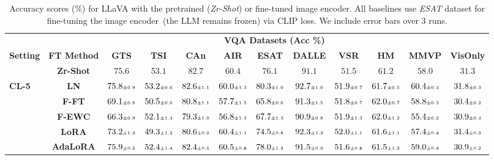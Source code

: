 \begin{table}
\caption{Accuracy scores (\%) for LLaVA with the pretrained (\emph{Zr-Shot}) or fine-tuned image encoder. All baselines use \emph{ESAT} dataset for fine-tuning the image encoder~(the LLM remains frozen) via CLIP loss. We include error bars over 3 runs.}
 \label{table:vlm_vqa_acc_eurosat_clip}
\vskip 0.15in
\begin{center}
\begin{small}
\begingroup
\setlength{\tabcolsep}{3.9pt}
\begin{tabular}{l c c c c c c c c c c c}
\toprule
 & & \multicolumn{9}{c}{\textbf{VQA Datasets (Acc \%)}}  \\
\cmidrule(lr){3-12}
\textbf{Setting} & \textbf{FT Method}  & \textbf{GTS} & \textbf{TSI} & \textbf{CAn} & \textbf{AIR} & \textbf{ESAT} & \textbf{DALLE} & \textbf{VSR} & \textbf{HM} & \textbf{MMVP} & \textbf{VisOnly} \\
\midrule
 & \textbf{Zr-Shot} & $75.6$ & $53.1$ & $82.7$ & $60.4$ & $76.1$ & $91.1$ & $51.5$ & $61.2$ & $58.0$ & $31.3$ \\
\midrule
\multirow{7}{*}{\textbf{CL-5}} & \textbf{LN} & $75.8 \mbox{\tiny\ensuremath{\pm 0.9}}$ & $53.2 \mbox{\tiny\ensuremath{\pm 0.6}}$ & $82.6 \mbox{\tiny\ensuremath{\pm 1.1}}$ & $60.0 \mbox{\tiny\ensuremath{\pm 1.3}}$ & $80.3 \mbox{\tiny\ensuremath{\pm 1.0}}$ & $92.7 \mbox{\tiny\ensuremath{\pm 1.0}}$ & $51.9 \mbox{\tiny\ensuremath{\pm 0.7}}$ & $61.7 \mbox{\tiny\ensuremath{\pm 0.5}}$ & $60.4 \mbox{\tiny\ensuremath{\pm 0.4}}$ & $31.8 \mbox{\tiny\ensuremath{\pm 0.3}}$ \\
& \textbf{F-FT} & $69.1 \mbox{\tiny\ensuremath{\pm 0.8}}$ & $50.5 \mbox{\tiny\ensuremath{\pm 0.6}}$ & $80.8 \mbox{\tiny\ensuremath{\pm 1.1}}$ & $57.7 \mbox{\tiny\ensuremath{\pm 1.5}}$ & $65.8 \mbox{\tiny\ensuremath{\pm 0.6}}$ & $91.3 \mbox{\tiny\ensuremath{\pm 1.5}}$ & $51.8 \mbox{\tiny\ensuremath{\pm 0.7}}$ & $62.0 \mbox{\tiny\ensuremath{\pm 0.7}}$ & $58.8 \mbox{\tiny\ensuremath{\pm 0.3}}$ & $30.4 \mbox{\tiny\ensuremath{\pm 0.2}}$ \\
& \textbf{F-EWC} & $66.3 \mbox{\tiny\ensuremath{\pm 0.9}}$ & $52.1 \mbox{\tiny\ensuremath{\pm 1.4}}$ & $79.3 \mbox{\tiny\ensuremath{\pm 1.0}}$ & $56.8 \mbox{\tiny\ensuremath{\pm 1.3}}$ & $67.7 \mbox{\tiny\ensuremath{\pm 1.3}}$ & $90.9 \mbox{\tiny\ensuremath{\pm 0.8}}$ & $51.9 \mbox{\tiny\ensuremath{\pm 1.3}}$ & $62.0 \mbox{\tiny\ensuremath{\pm 1.2}}$ & $55.4 \mbox{\tiny\ensuremath{\pm 0.2}}$ & $30.9 \mbox{\tiny\ensuremath{\pm 0.4}}$ \\
& \textbf{LoRA} & $73.2 \mbox{\tiny\ensuremath{\pm 1.3}}$ & $49.3 \mbox{\tiny\ensuremath{\pm 1.2}}$ & $80.6 \mbox{\tiny\ensuremath{\pm 0.9}}$ & $60.4 \mbox{\tiny\ensuremath{\pm 1.1}}$ & $74.5 \mbox{\tiny\ensuremath{\pm 0.8}}$ & $92.3 \mbox{\tiny\ensuremath{\pm 1.3}}$ & $52.0 \mbox{\tiny\ensuremath{\pm 1.1}}$ & $61.6 \mbox{\tiny\ensuremath{\pm 1.1}}$ & $57.4 \mbox{\tiny\ensuremath{\pm 0.4}}$ & $31.4 \mbox{\tiny\ensuremath{\pm 0.3}}$ \\
& \textbf{AdaLoRA} & $75.9 \mbox{\tiny\ensuremath{\pm 0.5}}$ & $52.4 \mbox{\tiny\ensuremath{\pm 1.4}}$ & $82.4 \mbox{\tiny\ensuremath{\pm 0.5}}$ & $60.5 \mbox{\tiny\ensuremath{\pm 0.8}}$ & $78.0 \mbox{\tiny\ensuremath{\pm 1.3}}$ & $91.5 \mbox{\tiny\ensuremath{\pm 0.9}}$ & $51.6 \mbox{\tiny\ensuremath{\pm 0.8}}$ & $61.5 \mbox{\tiny\ensuremath{\pm 1.3}}$ & $59.0 \mbox{\tiny\ensuremath{\pm 0.4}}$ & $30.9 \mbox{\tiny\ensuremath{\pm 0.2}}$ \\

\end{tabular}
\end{small}
\end{center}
\end{table}
